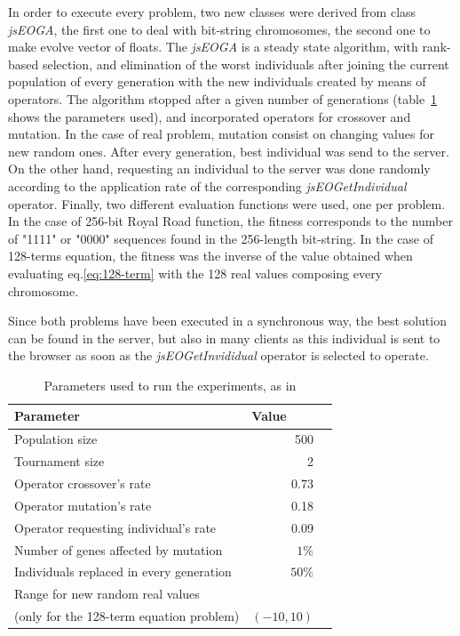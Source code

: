 \documentclass[runningheads,a4paper]{llncs}
\begin{document}
In order to execute every problem, two new classes were derived from class \textit{jsEOGA}, the first one to deal with bit-string chromosomes, the second one to make evolve vector of floats. The \textit{jsEOGA} is a steady state algorithm, with rank-based selection, and elimination of the worst individuals after joining the current population of every generation with the new individuals created by means of operators. The algorithm stopped after a given number of generations (table~\ref{tb:params} shows the parameters used), and incorporated operators for crossover and mutation. In the case of real problem, mutation consist on changing values for new random ones. After every generation, best individual was send to the server. On the other hand, requesting an individual to the server was done randomly according to the application rate of the corresponding \textit{jsEOGetIndividual} operator. Finally, two different evaluation functions were used, one per problem. In the case of 256-bit Royal Road function, the fitness corresponds to the number of "1111" or "0000" sequences found in the 256-length bit-string. In the case of 128-terms equation, the fitness was the inverse of the value obtained when evaluating eq.\ref{eq:128-term} with the 128 real values composing every chromosome.

Since both problems have been executed in a synchronous way, the best solution can be found in the server, but also in many clients as this individual is sent to the browser as soon as the \textit{jsEOGetInvididual} operator is selected to operate.



\begin{table}
\caption{Parameters used to run the experiments, as in{\cite{jj}}}
\begin{center}
\begin{tabular}{l@{\quad}rl}
\hline
\multicolumn{1}{l}{\rule{0pt}{12pt}
                   Parameter}&\multicolumn{2}{l}{Value}\\[2pt]
\hline\rule{0pt}{12pt}
Population size & 500 & \\
Tournament size & 2 & \\
Operator crossover's rate & 0.73 & \\
Operator mutation's rate & 0.18 & \\
Operator requesting individual's rate & 0.09 & \\
Number of genes affected by mutation & $1\%$ &\\
Individuals replaced in every generation & $50\%$ & \\
Range for new random real values && \\
(only for the 128-term equation problem) & $(-10,10)$ & \\[2pt]
\hline

\end{tabular}
\label{tb:params}
\end{center}
\end{table}
\end{document}
